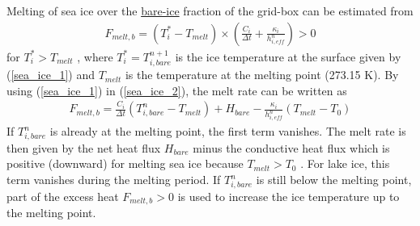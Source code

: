 %
%
%
%
Melting of sea ice over the \underline{bare-ice} fraction of the grid-box can be estimated from
\begin{align}
F_{melt,b}=\left (T_i^{\ast}-T_{melt} \right) \times \left ( \frac{C_i}{\Delta t} + \frac{\kappa_i}{h_{i,eff}^n} \right ) \label{sea_ice_2}> 0
\end{align}
for $T_i^{\ast}>T_{melt}$ , where $T_i^{\ast} = T_{i,bare}^{n+1}$ is the ice temperature at the surface given by (\eqref{sea_ice_1}) and $T_{melt}$ is
the temperature at the melting point (273.15 K). By using (\eqref{sea_ice_1}) in (\eqref{sea_ice_2}), the melt rate can be
written as
\begin{align}
F_{melt,b}=\frac{C_i}{\Delta t}\left (T_{i,bare}^{n}-T_{melt} \right)+H_{bare}-\frac{\kappa_i}{h_{i,eff}^n} \left (T_{melt}-T_{0} \right) \label{sea_ice_3}
\end{align}
If $T_{i,bare}^{n}$ is already at the melting point, the first term vanishes. The melt rate is then given by
the net heat flux $H_{bare}$ minus the conductive heat flux which is positive (downward) for
melting sea ice because $T_{melt}>T_{0}$ . For lake ice, this term vanishes during the melting period.
If $T_{i,bare}^{n}$ is still below the melting point, part of the excess heat $F_{melt,b} > 0$ is used to increase
the ice temperature up to the melting point.

